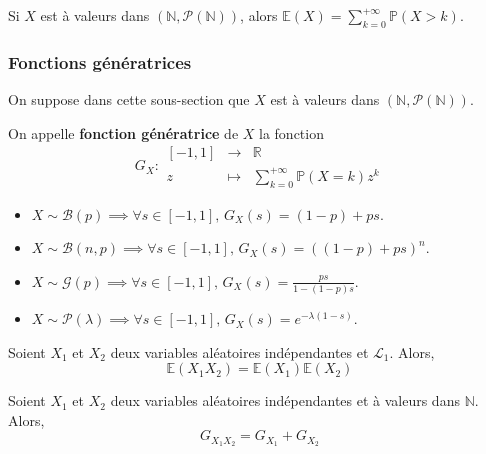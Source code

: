 
  \begin{proposition}
    Si $X$ est à valeurs dans $(\mathbb{N}, \mathcal{P}(\mathbb{N}))$, alors $\mathbb{E}(X) = \sum_{k=0}^{+\infty} \mathbb{P}(X > k)$.
  \end{proposition}

  \subsubsection{Fonctions génératrices}

  On suppose dans cette sous-section que $X$ est à valeurs dans $(\mathbb{N}, \mathcal{P}(\mathbb{N}))$.


  \begin{definition}
    On appelle \textbf{fonction génératrice} de $X$ la fonction
    \[
      G_X :
      \begin{array}{ccc}
        [-1,1] &\rightarrow& \mathbb{R} \\
        z &\mapsto& \sum_{k=0}^{+\infty} \mathbb{P}(X=k) z^k
      \end{array}
    \]
  \end{definition}

  \begin{example}
    \begin{itemize}
      \item $X \sim \mathcal{B}(p) \implies \forall s \in [-1,1], \, G_X(s) = (1-p) + ps$.
      \item $X \sim \mathcal{B}(n, p) \implies \forall s \in [-1,1], \, G_X(s) = ((1-p) + ps)^n$.
      \item $X \sim \mathcal{G}(p) \implies \forall s \in [-1,1], \, G_X(s) = \frac{ps}{1-(1-p)s}$.
      \item $X \sim \mathcal{P}(\lambda) \implies \forall s \in [-1,1], \, G_X(s) = e^{-\lambda (1-s)}$.
    \end{itemize}
  \end{example}

  \begin{theorem}
    Soient $X_1$ et $X_2$ deux variables aléatoires indépendantes et $\mathcal{L}_1$. Alors,
    \[ \mathbb{E}(X_1 X_2) = \mathbb{E}(X_1) \mathbb{E}(X_2) \]
  \end{theorem}

  \begin{corollary}
    Soient $X_1$ et $X_2$ deux variables aléatoires indépendantes et à valeurs dans $\mathbb{N}$. Alors,
    \[ G_{X_1 X_2} = G_{X_1} + G_{X_2} \]
  \end{corollary}

